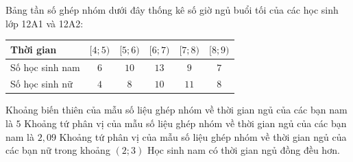 \begin{ex}
    Bảng tần số ghép nhóm dưới đây thống kê số giờ ngủ buổi tối của các học sinh lớp 12A1 và 12A2:
    \begin{center}
        \begin{tabular}{|l|c|c|c|c|c|}
            \hline
            Thời gian & $[4; 5)$ & $[5; 6)$ & $[6; 7)$ & $[7; 8)$ & $[8; 9)$ \\
            \hline
            Số học sinh nam & $6$ & $10$ & $13$ & $9$ & $7$ \\
            \hline
            Số học sinh nữ & $4$ & $8$ & $10$ & $11$ & $8$ \\
            \hline
        \end{tabular}
    \end{center}
    \choiceTF
    {\True Khoảng biến thiên của mẫu số liệu ghép nhóm về thời gian ngủ của các bạn nam là $5$}
    {Khoảng tứ phân vị của mẫu số liệu ghép nhóm về thời gian ngủ của các bạn nam là $2,09$}
    {\True Khoảng tứ phân vị của mẫu số liệu ghép nhóm về thời gian ngủ của các bạn nữ trong khoảng $(2; 3)$}
    {\True Học sinh nam có thời gian ngủ đồng đều hơn.}
\end{ex}
